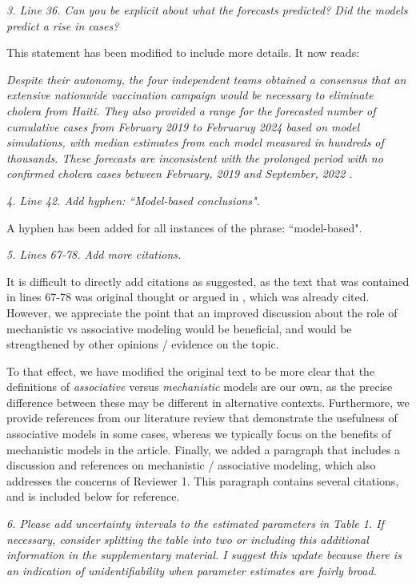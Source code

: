 \documentclass[11pt]{article}
\newcommand\report[1]{{\color{mygreen} \vspace{1mm}\hspace{0.25in}\parbox{6in}{\em #1}}}
\newcommand\article[1]{{\color{blue} \vspace{1mm}\hspace{0.25in}\parbox{6in}{\em #1}}}
\begin{document}
\report{
  3. Line 36. Can you be explicit about what the forecasts predicted? Did the models predict a rise in cases?
}

This statement has been modified to include more details. It now reads: 

\article{Despite their autonomy, the four independent teams obtained a consensus that an extensive nationwide vaccination campaign would be necessary to eliminate cholera from Haiti. They also provided a range for the forecasted number of cumulative cases from February 2019 to Februaruy 2024 based on model simulations, with median estimates from each model measured in hundreds of thousands.
These forecasts are inconsistent with the prolonged period with no confirmed cholera cases between February, 2019 and September, 2022 \cite{trevisin22}.}

\report{
  4. Line 42. Add hyphen: ``Model-based conclusions".
}

A hyphen has been added for all instances of the phrase: ``model-based".

\report{
  5. Lines 67-78. Add more citations.
}

It is difficult to directly add citations as suggested, as the text that was contained in lines 67-78 was original thought or argued in \cite{lucas76}, which was already cited. However, we appreciate the point that an improved discussion about the role of mechanistic vs associative modeling would be beneficial, and would be strengthened by other opinions / evidence on the topic. 

To that effect, we have modified the original text to be more clear that the definitions of \emph{associative} versus \emph{mechanistic} models are our own, as the precise difference between these may be different in alternative contexts. 
Furthermore, we provide references from our literature review that demonstrate the usefulness of associative models in some cases, whereas we typically focus on the benefits of mechanistic models in the article. 
Finally, we added a paragraph that includes a discussion and references on mechanistic / associative modeling, which also addresses the concerns of Reviewer 1. This paragraph contains several citations, and is included below for reference. 

\article{\editMechModels}

\report{
  6. Please add uncertainty intervals to the estimated parameters in Table 1. If necessary, consider splitting the table into two or including this additional information in the supplementary material. I suggest this update because there is an indication of unidentifiability when parameter estimates are fairly broad.
}
\end{document}
